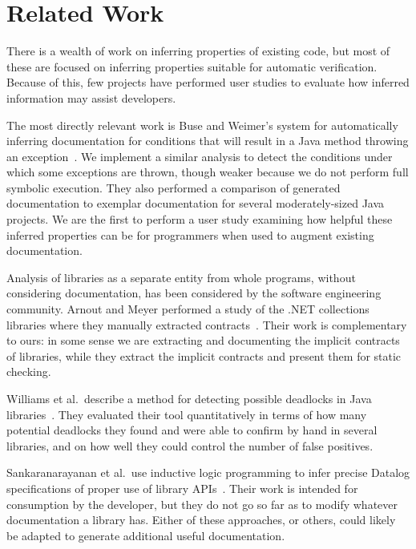 \section{Related Work}
There is a wealth of work on inferring properties of existing code,
but most of these are focused on inferring properties suitable for automatic
verification.
Because of this, few projects have performed user studies to evaluate how
inferred information may assist developers.

The most directly relevant work is Buse and Weimer's system for automatically
inferring documentation for conditions that will result in a Java method
throwing an exception~\cite{autodoc}.  We implement a similar analysis
to detect the conditions under which some exceptions are thrown, though weaker
because we do not perform full symbolic execution.  They also performed a
comparison of generated documentation to exemplar documentation for several
moderately-sized Java projects.  We are the first to perform a user study
examining how
helpful these inferred properties can be for programmers when used to augment existing
documentation.

Analysis of libraries as a separate entity from whole programs, without
considering documentation, has been considered by the software
engineering community.  Arnout and Meyer performed a study of the .NET
collections libraries where they manually extracted
contracts~\cite{findingcontracts}.  Their work is complementary to ours: in some
sense we are extracting and documenting the implicit contracts of libraries,
while they extract the implicit contracts and present them for static checking.

Williams et al.~describe a method for detecting possible deadlocks in Java
libraries~\cite{deadlocklibs}.  They evaluated their tool quantitatively in
terms of how many potential deadlocks they found and were able to confirm by
hand in several libraries, and on how well they could control the number of
false positives.

Sankaranarayanan et al.~use inductive logic
programming to infer precise Datalog specifications of proper use of library
APIs~\cite{mininglibspecs}.  Their work is intended for consumption by the
developer, but they do not go so far as to modify whatever documentation a
library has.  Either of these approaches, or others, could likely be adapted to
generate additional useful documentation.

